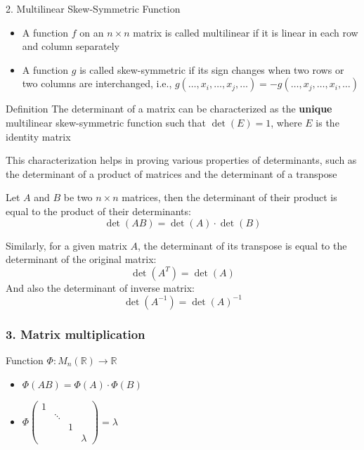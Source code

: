 \documentclass[fullscreen=true, bookmarks=true, hyperref={pdfencoding=unicode}]{beamer}
\begin{document}
\begin{frame}{2. Multilinear Skew-Symmetric Function}
  \begin{itemize}
    \item A function $f$ on an $n \times n$ matrix is called multilinear if it is linear in each row and column separately
    \item A function $g$ is called skew-symmetric if its sign changes when two rows or two columns are interchanged, i.e., $g(\dots, x_i, \dots, x_j, \dots) = -g(\dots, x_j, \dots, x_i, \dots)$        
  \end{itemize}

  \pause
  \begin{block}{Definition}
    The determinant of a matrix can be characterized as the 
    \textbf{unique} multilinear skew-symmetric function 
    such that $\det(E) = 1$, where $E$ is the identity matrix
  \end{block}
\end{frame}


\begin{frame}
    This characterization helps in proving various properties 
    of determinants, such as the determinant of a product 
    of matrices and the determinant of a transpose
  
  \begin{example}
    Let $A$ and $B$ be two $n \times n$ matrices, then the determinant 
    of their product is equal to the product of their determinants:
    \[
      \det(AB) = \det(A) \cdot \det(B)
    \]  
  \end{example}
  
  Similarly, for a given matrix $A$, the determinant of its transpose 
  is equal to the determinant of the original matrix:
    \[
      \det(A^T) = \det(A)
    \]
  And also the determinant of inverse matrix:
  \[
    \det(A^{-1}) = \det(A)^{-1}
  \]
\end{frame}


\begin{frame}
  \frametitle{3. Matrix multiplication}

  Function $\Phi: M_{n}(\mathbb{R}) \to \mathbb{R}$

  \begin{itemize}
    \item $\Phi(AB) = \Phi(A)\cdot \Phi(B)$
    \item $\Phi \begin{pmatrix}
      1 & & & \\
        & \ddots & & \\
        &  & 1 & \\
        &  &   & \lambda
    \end{pmatrix} = \lambda$
  \end{itemize}
\end{frame}
\end{document}
